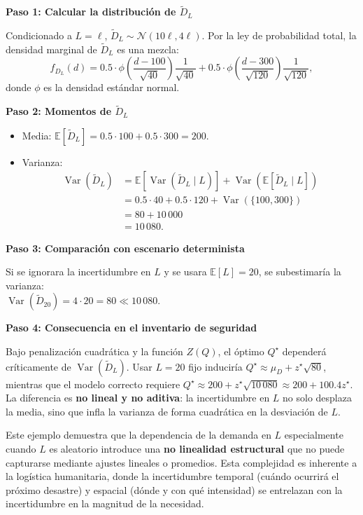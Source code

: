 \documentclass[
  spanish,
  us-letterpaper,
]{scrreprt}
\providecommand{\tightlist}{%
  \setlength{\itemsep}{0pt}\setlength{\parskip}{0pt}}
\numberwithin{equation}{section}
\begin{document}
\textbf{Paso 1: Calcular la distribución de \(\tilde{D}_L\)}

Condicionado a \(L = \ell\),
\(\tilde{D}_L \sim \mathcal{N}(10\ell, 4\ell)\). Por la ley de
probabilidad total, la densidad marginal de \(\tilde{D}_L\) es una
mezcla: \[
f_{D_L}(d) = 0.5 \cdot \phi\left( \frac{d - 100}{\sqrt{40}} \right) \frac{1}{\sqrt{40}} + 0.5 \cdot \phi\left( \frac{d - 300}{\sqrt{120}} \right) \frac{1}{\sqrt{120}},
\] donde \(\phi\) es la densidad estándar normal.

\textbf{Paso 2: Momentos de \(\tilde{D}_L\)}

\begin{itemize}
\tightlist
\item
  Media:
  \(\mathbb{E}[\tilde{D}_L] = 0.5 \cdot 100 + 0.5 \cdot 300 = 200\).
\item
  Varianza:\\
  \[
  \begin{aligned}
  \operatorname{Var}(\tilde{D}_L) 
  &= \mathbb{E}[\operatorname{Var}(\tilde{D}_L \mid L)] 
   + \operatorname{Var}(\mathbb{E}[\tilde{D}_L \mid L]) \\[4pt]
  &= 0.5 \cdot 40 + 0.5 \cdot 120 
   + \operatorname{Var}(\{100, 300\}) \\[4pt]
  &= 80 + 10\,000 \\[4pt]
  &= 10\,080.
  \end{aligned}
  \]
\end{itemize}

\textbf{Paso 3: Comparación con escenario determinista}

Si se ignorara la incertidumbre en \(L\) y se usara
\(\mathbb{E}[L] = 20\), se subestimaría la varianza:\\
\(\operatorname{Var}(\tilde{D}_{20}) = 4 \cdot 20 = 80 \ll 10\,080\).

\textbf{Paso 4: Consecuencia en el inventario de seguridad}

Bajo penalización cuadrática y la función \(Z(Q)\), el óptimo
\(Q^\star\) dependerá críticamente de
\(\operatorname{Var}(\tilde{D}_L)\). Usar \(L = 20\) fijo induciría
\(Q^\star \approx \mu_D + z^\star \sqrt{80}\), mientras que el modelo
correcto requiere
\(Q^\star \approx 200 + z^\star \sqrt{10\,080} \approx 200 + 100.4 z^\star\).
La diferencia es \textbf{no lineal y no aditiva}: la incertidumbre en
\(L\) no solo desplaza la media, sino que infla la varianza de forma
cuadrática en la desviación de \(L\).

Este ejemplo demuestra que la dependencia de la demanda en \(L\)
especialmente cuando \(L\) es aleatorio introduce una \textbf{no
linealidad estructural} que no puede capturarse mediante ajustes
lineales o promedios. Esta complejidad es inherente a la logística
humanitaria, donde la incertidumbre temporal (cuándo ocurrirá el próximo
desastre) y espacial (dónde y con qué intensidad) se entrelazan con la
incertidumbre en la magnitud de la necesidad.
\end{document}
